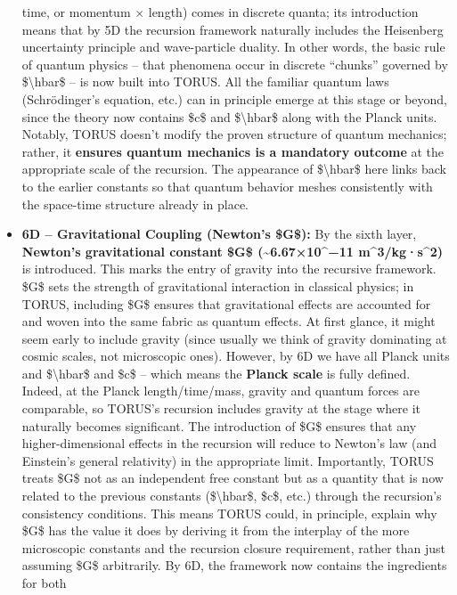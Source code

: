 \documentclass[
]{article}
\begin{document}
\begin{itemize}
  time, or momentum × length) comes in discrete quanta; its introduction
  means that by 5D the recursion framework naturally includes the
  Heisenberg uncertainty principle and wave-particle duality. In other
  words, the basic rule of quantum physics -- that phenomena occur in
  discrete ``chunks'' governed by \$\textbackslash hbar\$ -- is now
  built into TORUS. All the familiar quantum laws (Schrödinger's
  equation, etc.) can in principle emerge at this stage or beyond, since
  the theory now contains \$c\$ and \$\textbackslash hbar\$ along with
  the Planck units. Notably, TORUS doesn't modify the proven structure
  of quantum mechanics; rather, it \textbf{ensures quantum mechanics is
  a mandatory outcome} at the appropriate scale of the recursion. The
  appearance of \$\textbackslash hbar\$ here links back to the earlier
  constants so that quantum behavior meshes consistently with the
  space-time structure already in place.
\item
  \textbf{6D -- Gravitational Coupling (Newton's \$G\$):} By the sixth
  layer, \textbf{Newton's gravitational constant \$G\$
  (\textasciitilde6.67×10\^{}−11 m\^{}3/kg·s\^{}2)} is introduced. This
  marks the entry of gravity into the recursive framework. \$G\$ sets
  the strength of gravitational interaction in classical physics; in
  TORUS, including \$G\$ ensures that gravitational effects are
  accounted for and woven into the same fabric as quantum effects. At
  first glance, it might seem early to include gravity (since usually we
  think of gravity dominating at cosmic scales, not microscopic ones).
  However, by 6D we have all Planck units and \$\textbackslash hbar\$
  and \$c\$ -- which means the \textbf{Planck scale} is fully defined.
  Indeed, at the Planck length/time/mass, gravity and quantum forces are
  comparable, so TORUS's recursion includes gravity at the stage where
  it naturally becomes significant. The introduction of \$G\$ ensures
  that any higher-dimensional effects in the recursion will reduce to
  Newton's law (and Einstein's general relativity) in the appropriate
  limit. Importantly, TORUS treats \$G\$ not as an independent free
  constant but as a quantity that is now related to the previous
  constants (\$\textbackslash hbar\$, \$c\$, etc.) through the
  recursion's consistency conditions. This means TORUS could, in
  principle, explain why \$G\$ has the value it does by deriving it from
  the interplay of the more microscopic constants and the recursion
  closure requirement, rather than just assuming \$G\$ arbitrarily. By
  6D, the framework now contains the ingredients for both

\end{itemize}
\end{document}
